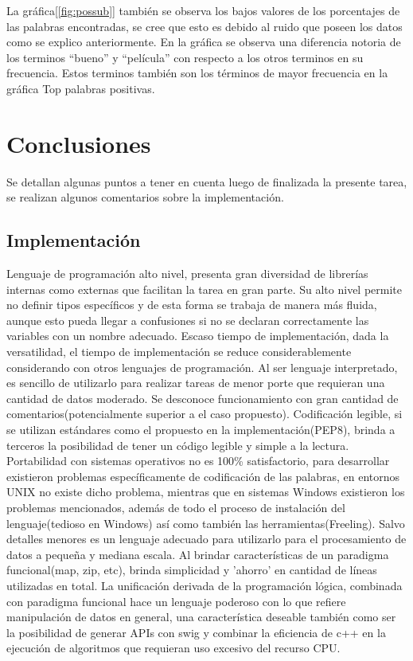 \documentclass[12pt]{article}
\begin{document}
La gráfica[\ref{fig:possub}] también se observa los bajos valores de los porcentajes de las palabras encontradas, se cree que esto es debido al ruido que poseen los datos como se explico anteriormente. En la gráfica se observa una diferencia notoria de los terminos “bueno” y “película” con respecto a los otros terminos en su frecuencia. Estos terminos también son los términos de mayor frecuencia en la gráfica Top palabras positivas.

\section{Conclusiones}\label{conclusions}
Se detallan algunas puntos a tener en cuenta luego de finalizada la presente tarea, se realizan algunos comentarios sobre la implementación.

\subsection{Implementación}
Lenguaje de programación alto nivel, presenta gran diversidad de librerías internas como externas que facilitan la tarea en gran parte. Su alto nivel permite no definir tipos específicos y de esta forma se trabaja de manera más fluida, aunque esto pueda llegar a confusiones si no se declaran correctamente las variables con un nombre adecuado.
Escaso tiempo de implementación, dada la versatilidad, el tiempo de implementación se reduce considerablemente considerando con otros lenguajes de programación.
Al ser lenguaje interpretado, es sencillo de utilizarlo para realizar tareas de menor porte que requieran una cantidad de datos moderado. Se desconoce funcionamiento con gran cantidad de comentarios(potencialmente superior a el caso propuesto).
Codificación legible, si se utilizan estándares como el propuesto en la implementación(PEP8), brinda a terceros la posibilidad de tener un código legible y simple a la lectura.
Portabilidad con sistemas operativos no es 100\% satisfactorio, para desarrollar existieron problemas específicamente de codificación de las palabras, en entornos UNIX no existe dicho problema, mientras que en sistemas Windows existieron los problemas mencionados, además de todo el proceso de instalación del lenguaje(tedioso en Windows) así como también las herramientas(Freeling).
Salvo detalles menores es un lenguaje adecuado para utilizarlo para el procesamiento de datos a pequeña y mediana escala.
Al brindar características de un paradigma funcional(map, zip, etc), brinda simplicidad y 'ahorro' en cantidad de líneas utilizadas en total.
La unificación derivada de la programación lógica, combinada con paradigma funcional hace un lenguaje poderoso con lo que refiere manipulación de datos en general, una característica deseable también como  ser la posibilidad de generar APIs con swig y combinar la eficiencia de c++ en la ejecución de algoritmos que requieran uso excesivo del recurso CPU. 





%
%
\end{document}
